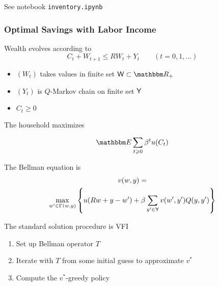 \begin{frame}
    
    See notebook \texttt{inventory.ipynb}

\end{frame}


\begin{frame}
    \frametitle{Optimal Savings with Labor Income}

    
    Wealth evolves according to
    \begin{equation*}
        C_t + W_{t+1} \leq R W_t + Y_t 
        \qquad (t = 0, 1, \ldots)
    \end{equation*}

        \vspace{0.5em}
    \begin{itemize}
        \item $(W_t)$ takes values in finite set $\Wsf \subset \RR_+$ 
        \vspace{0.5em}
        \item $(Y_t)$ is $Q$-Markov chain on finite set $\mathsf Y$ 
        \vspace{0.5em}
        \item $C_t \geq 0$
    \end{itemize}

        \vspace{0.5em}
    The household maximizes

    \begin{equation*}
        \EE \sum_{t \geq 0} \beta^t u(C_t)
    \end{equation*}


\end{frame}

\begin{frame}
    
    The Bellman equation is
    \begin{multline*}
        v(w, y) = 
        \\
        \max_{w' \in \Gamma(w, y)}
        \left\{
            u(R w + y - w')
            + \beta \sum_{y' \in \mathsf Y} v(w', y') Q(y, y')
        \right\}
    \end{multline*}

        \vspace{0.5em}
        \vspace{0.5em}
    The standard solution procedure is VFI

    \begin{enumerate}
        \item Set up Bellman operator $T$
        \vspace{0.5em}
        \item Iterate with $T$ from some initial guess to approximate $v^*$
        \vspace{0.5em}
        \item Compute the $v^*$-greedy policy
    \end{enumerate}

\end{frame}



